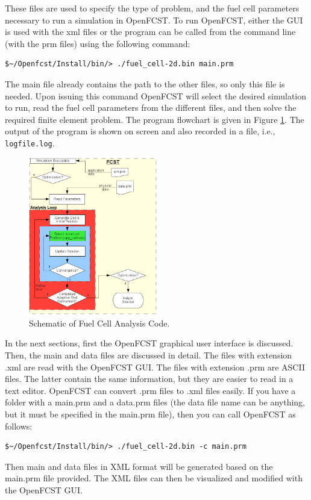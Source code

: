 These files are used to specify the type of problem, and the fuel cell parameters necessary to run a simulation in OpenFCST. To run OpenFCST, either the GUI is used with the xml files or the program can be called from the command line (with the prm files) using the following command:
\begin{lstlisting}
$~/Openfcst/Install/bin/> ./fuel_cell-2d.bin main.prm
\end{lstlisting}
The main file already contains the path to the other files, so only this file is needed. Upon issuing this command OpenFCST will select the desired simulation to run, read the fuel cell parameters from the different files, and then solve the required finite element problem. The program flowchart is given in Figure \ref{analysis_schematic}. The output of the program is shown on screen and also recorded in a file, i.e., \texttt{logfile.log}.

\begin{figure}[h]
\begin{center}
\includegraphics[width=0.5\textwidth]{figures/analysis_schematic.png}
\caption{Schematic of Fuel Cell Analysis Code.}
\label{analysis_schematic}
\end{center}
\end{figure}

In the next sections, first the OpenFCST graphical user interface is discussed. Then, the main and data files are discussed in detail. The files with extension .xml are read with the OpenFCST GUI. The files with extension .prm are ASCII files. The latter contain the same information, but they are easier to read in a text editor. OpenFCST can convert .prm files to .xml files easily. If you have a folder with a main.prm and a data.prm files (the data file name can be anything, but it must be specified in the main.prm file), then you can call OpenFCST as follows:
\begin{lstlisting}
$~/Openfcst/Install/bin/> ./fuel_cell-2d.bin -c main.prm
\end{lstlisting}
Then main and data files in XML format will be generated based on the main.prm file provided. The XML files can then be visualized and modified with the OpenFCST GUI.

